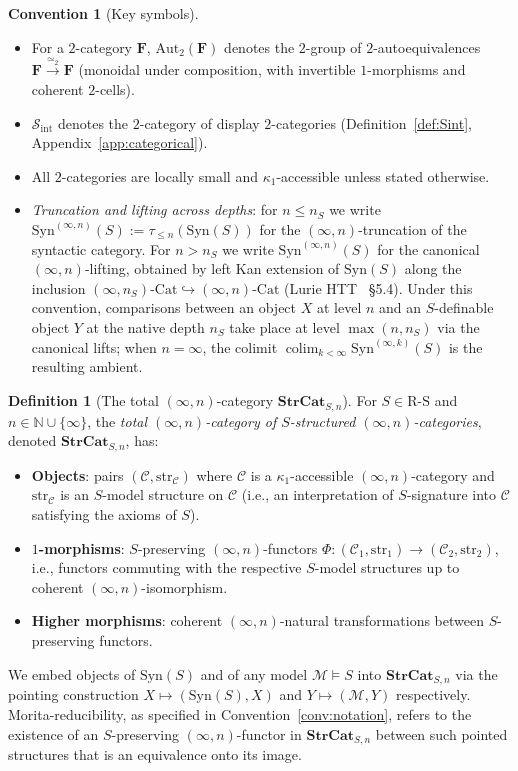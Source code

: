 \documentclass[11pt]{article}
\theoremstyle{plain}
\theoremstyle{definition}
\newtheorem{definition}[theorem]{Definition}
\newtheorem{convention}[theorem]{Convention}
\newcommand{\RS}{\mathrm{R\text{-}S}}
\newcommand{\cS}{\mathcal{S}}
\newcommand{\cM}{\mathcal{M}}
\newcommand{\cC}{\mathcal{C}}
\newcommand{\Sint}{\cS_{\mathrm{int}}}
\newcommand{\Cat}{\mathrm{Cat}}
\newcommand{\Syn}{\mathrm{Syn}}
\DeclareMathOperator{\colim}{colim}
\begin{document}
\begin{convention}[Key symbols]
\begin{itemize}
\item For a $2$-category $\mathbf{F}$, $\mathrm{Aut}_2(\mathbf{F})$ denotes the $2$-group of $2$-autoequivalences $\mathbf{F} \xrightarrow{\simeq_2} \mathbf{F}$ (monoidal under composition, with invertible $1$-morphisms and coherent $2$-cells).
\item $\Sint$ denotes the $2$-category of display $2$-categories (Definition~\ref{def:Sint}, Appendix~\ref{app:categorical}).
\item All $2$-categories are locally small and $\kappa_1$-accessible unless stated otherwise.
\item \emph{Truncation and lifting across depths}: for $n \leq n_S$ we write $\Syn^{(\infty, n)}(S) := \tau_{\leq n}(\Syn(S))$ for the $(\infty, n)$-truncation of the syntactic category. For $n > n_S$ we write $\Syn^{(\infty, n)}(S)$ for the canonical $(\infty, n)$-lifting, obtained by left Kan extension of $\Syn(S)$ along the inclusion $(\infty, n_S)\text{-}\Cat \hookrightarrow (\infty, n)\text{-}\Cat$ (Lurie HTT~\cite{LurieHTT} \S 5.4). Under this convention, comparisons between an object $X$ at level $n$ and an $S$-definable object $Y$ at the native depth $n_S$ take place at level $\max(n, n_S)$ via the canonical lifts; when $n = \infty$, the colimit $\colim_{k < \infty} \Syn^{(\infty, k)}(S)$ is the resulting ambient.
\end{itemize}
\end{convention}

\begin{definition}[The total $(\infty, n)$-category $\mathbf{StrCat}_{S, n}$]\label{def:strcat}
For $S \in \RS$ and $n \in \mathbb{N} \cup \{\infty\}$, the \emph{total $(\infty, n)$-category of $S$-structured $(\infty, n)$-categories}, denoted $\mathbf{StrCat}_{S, n}$, has:
\begin{itemize}
\item \textbf{Objects}: pairs $(\cC, \mathrm{str}_\cC)$ where $\cC$ is a $\kappa_1$-accessible $(\infty, n)$-category and $\mathrm{str}_\cC$ is an $S$-model structure on $\cC$ (i.e., an interpretation of $S$-signature into $\cC$ satisfying the axioms of $S$).
\item \textbf{$1$-morphisms}: $S$-preserving $(\infty, n)$-functors $\Phi : (\cC_1, \mathrm{str}_1) \to (\cC_2, \mathrm{str}_2)$, i.e., functors commuting with the respective $S$-model structures up to coherent $(\infty, n)$-isomorphism.
\item \textbf{Higher morphisms}: coherent $(\infty, n)$-natural transformations between $S$-preserving functors.
\end{itemize}
We embed objects of $\Syn(S)$ and of any model $\cM \models S$ into $\mathbf{StrCat}_{S, n}$ via the pointing construction $X \mapsto (\Syn(S), X)$ and $Y \mapsto (\cM, Y)$ respectively. Morita-reducibility, as specified in Convention~\ref{conv:notation}, refers to the existence of an $S$-preserving $(\infty, n)$-functor in $\mathbf{StrCat}_{S, n}$ between such pointed structures that is an equivalence onto its image.
\end{definition}
\end{document}
